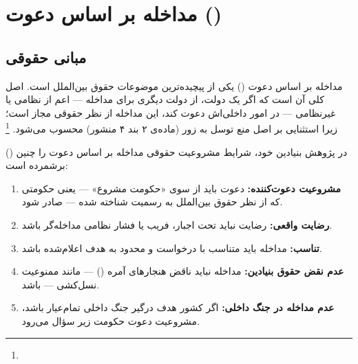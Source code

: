 \section{مداخله بر اساس دعوت (\texorpdfstring{}{Intervention by Invitation})}
\label{sec:ch02-invitation}

\subsection{مبانی حقوقی}
\label{subsec:ch02-invitation-legal}

مداخله بر اساس دعوت () یکی از پیچیده‌ترین موضوعات حقوق بین‌الملل است. اصل کلی آن است که اگر  یک دولت، از دولت دیگری برای مداخله — اعم از نظامی یا غیرنظامی — در امور داخلی‌اش دعوت کند، این مداخله از نظر حقوقی مجاز است؛ زیرا  استثنایی بر اصل منع توسل به زور (ماده‌ی ۲ بند ۴ منشور) محسوب می‌شود.%
\footnote{}

 () در پژوهش بنیادین خود، شرایط مشروعیت حقوقی مداخله بر اساس دعوت را چنین برشمرده است:

\begin{tcolorbox}[legalbox, title={شرایط حقوقی مداخله بر اساس دعوت}]
\begin{enumerate}[nosep, label=\textbf{شرط \arabic*:}]
  \item \textbf{مشروعیت دعوت‌کننده:} دعوت باید از سوی «حکومت مشروع» — یعنی حکومتی که از نظر حقوق بین‌الملل به رسمیت شناخته شده — صادر شود.
  \item \textbf{رضایت واقعی:} رضایت نباید تحت اجبار، فریب یا فشار نظامی مداخله‌گر باشد.
  \item \textbf{تناسب:} مداخله باید متناسب با درخواست و محدود به هدف اعلام‌شده باشد.
  \item \textbf{عدم نقض حقوق بنیادین:} مداخله نباید ناقض هنجارهای آمره () — مانند ممنوعیت نسل‌کشی — باشد.
  \item \textbf{عدم مداخله در جنگ داخلی:} اگر کشور هدف درگیر جنگ داخلی تمام‌عیار باشد، مشروعیت دعوت حکومت زیر سؤال می‌رود.
\end{enumerate}
\end{tcolorbox}

